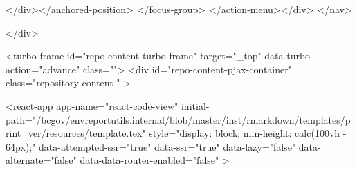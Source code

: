 </div></anchored-position>  </focus-group>
</action-menu></div>
</nav>

  </div>

  



<turbo-frame id="repo-content-turbo-frame" target="_top" data-turbo-action="advance" class="">
    <div id="repo-content-pjax-container" class="repository-content " >
    



    
      
    








<react-app
  app-name="react-code-view"
  initial-path="/bcgov/envreportutils.internal/blob/master/inst/rmarkdown/templates/print_ver/resources/template.tex"
    style="display: block; min-height: calc(100vh - 64px);"
  data-attempted-ssr="true"
  data-ssr="true"
  data-lazy="false"
  data-alternate="false"
  data-data-router-enabled="false"
>
  
